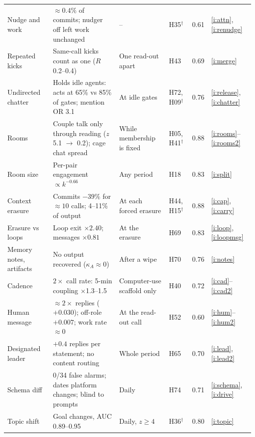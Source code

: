 \documentclass[aps,pre,reprint,10pt,nofootinbib]{revtex4-2}
\begin{document}
\begin{table}[p]
\begin{ruledtabular}
\begin{tabular}{p{}p{}p{}p{}ll}
\raggedright Nudge and work & \raggedright $\approx0.4\%$ of commits; nudger off left work unchanged & \raggedright -- & \raggedright H35$^\dagger$ & 0.61 & \ref{i:attn}, \ref{i:renudge} \tabularnewline
\raggedright Repeated kicks & \raggedright Same-call kicks count as one ($R$ 0.2--0.4) & \raggedright One read-out apart & \raggedright H43 & 0.69 & \ref{i:merge} \tabularnewline
\raggedright Undirected chatter & \raggedright Holds idle agents: acts at 65\% vs 85\% of gates; mention OR 3.1 & \raggedright At idle gates & \raggedright H72, H09$^\dagger$ & 0.76 & \ref{i:release}, \ref{i:chatter} \tabularnewline
\raggedright Rooms & \raggedright Couple talk only through reading ($z$ 5.1 $\to$ 0.2); cage chat spread & \raggedright While membership is fixed & \raggedright H05, H41$^\dagger$ & 0.88 & \ref{i:rooms}--\ref{i:rooms2} \tabularnewline
\raggedright Room size & \raggedright Per-pair engagement $\propto k^{-0.66}$ & \raggedright Any period & \raggedright H18 & 0.83 & \ref{i:split} \tabularnewline
\raggedright Context erasure & \raggedright Commits $-39\%$ for $\approx10$ calls; 4--11\% of output & \raggedright At each forced erasure & \raggedright H44, H15$^\dagger$ & 0.88 & \ref{i:cap}, \ref{i:carry} \tabularnewline
\raggedright Erasure vs loops & \raggedright Loop exit $\times2.40$; messages $\times0.81$ & \raggedright At the erasure & \raggedright H69 & 0.83 & \ref{i:loop}, \ref{i:loopmsg} \tabularnewline
\raggedright Memory notes, artifacts & \raggedright No output recovered ($\kappa_A\approx0$) & \raggedright After a wipe & \raggedright H70 & 0.76 & \ref{i:notes} \tabularnewline
\raggedright Cadence & \raggedright $2\times$ call rate: 5-min coupling $\times$1.3--1.5 & \raggedright Computer-use scaffold only & \raggedright H40 & 0.72 & \ref{i:cad}--\ref{i:cad2} \tabularnewline
\raggedright Human message & \raggedright $\approx2\times$ replies ($+0.030$); off-role $+0.007$; work rate $\approx0$ & \raggedright At the read-out call & \raggedright H52 & 0.60 & \ref{i:hum}--\ref{i:hum2} \tabularnewline
\raggedright Designated leader & \raggedright $+0.4$ replies per statement; no content routing & \raggedright Whole period & \raggedright H65 & 0.70 & \ref{i:lead}, \ref{i:lead2} \tabularnewline
\colrule
\raggedright Schema diff & \raggedright 0/34 false alarms; dates platform changes; blind to prompts & \raggedright Daily & \raggedright H74 & 0.71 & \ref{i:schema}, \ref{i:drive} \tabularnewline
\raggedright Topic shift & \raggedright Goal changes, AUC 0.89--0.95 & \raggedright Daily, $z\ge4$ & \raggedright H36$^\dagger$ & 0.80 & \ref{i:topic} \tabularnewline

\end{tabular}
\end{ruledtabular}
\end{table}
\end{document}
